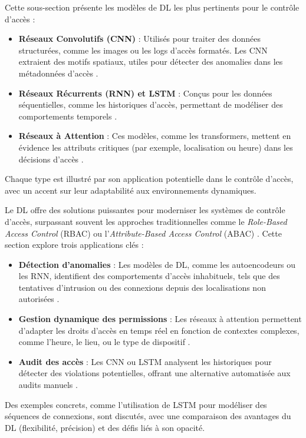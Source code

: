 Cette sous-section présente les modèles de DL les plus pertinents pour le contrôle d’accès :
\begin{itemize}
    \item \textbf{Réseaux Convolutifs (CNN)} : Utilisés pour traiter des données structurées, comme les images ou les logs d’accès formatés. Les CNN extraient des motifs spatiaux, utiles pour détecter des anomalies dans les métadonnées d’accès \cite{selvaraju2017gradcam}.
    \item \textbf{Réseaux Récurrents (RNN) et LSTM} : Conçus pour les données séquentielles, comme les historiques d’accès, permettant de modéliser des comportements temporels \cite{karpathy2015visualizing}.
    \item \textbf{Réseaux à Attention} : Ces modèles, comme les transformers, mettent en évidence les attributs critiques (par exemple, localisation ou heure) dans les décisions d’accès \cite{lin2017structured}.
\end{itemize}
Chaque type est illustré par son application potentielle dans le contrôle d’accès, avec un accent sur leur adaptabilité aux environnements dynamiques.

Le DL offre des solutions puissantes pour moderniser les systèmes de contrôle d’accès, surpassant souvent les approches traditionnelles comme le \textit{Role-Based Access Control} (RBAC) ou l’\textit{Attribute-Based Access Control} (ABAC) \cite{sandhu1996role, hu2013abac}. Cette section explore trois applications clés :
\begin{itemize}
    \item \textbf{Détection d’anomalies} : Les modèles de DL, comme les autoencodeurs ou les RNN, identifient des comportements d’accès inhabituels, tels que des tentatives d’intrusion ou des connexions depuis des localisations non autorisées \cite{nobi2022dlbac}.
    \item \textbf{Gestion dynamique des permissions} : Les réseaux à attention permettent d’adapter les droits d’accès en temps réel en fonction de contextes complexes, comme l’heure, le lieu, ou le type de dispositif \cite{lin2017structured}.
    \item \textbf{Audit des accès} : Les CNN ou LSTM analysent les historiques pour détecter des violations potentielles, offrant une alternative automatisée aux audits manuels \cite{ahmed2021xai}.
\end{itemize}
Des exemples concrets, comme l’utilisation de LSTM pour modéliser des séquences de connexions, sont discutés, avec une comparaison des avantages du DL (flexibilité, précision) et des défis liés à son opacité.


